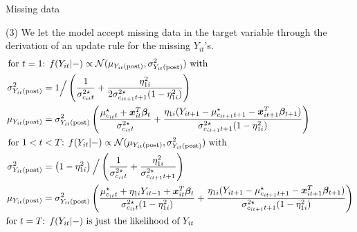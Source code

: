 \documentclass[
	11pt, %
 xcolor={dvipsnames,svgnames}
]{beamer}
\newcommand\numberthis{\addtocounter{equation}{1}\tag{\theequation}}
\begin{document}
\begin{frame}{Missing data}
    
\alert{(3) We let the model accept missing data in the target variable} through the derivation of an update rule for the missing $Y_{it}$'s.
        {\footnotesize %
\begin{align*}
\text{for }t=1 &\text{: }
  f(Y_{it}|-)\propto \text{$\mathcal{N}(\mu_{Y_{it}\text{(post)}},\sigma^2_{Y_{it}\text{(post)}})$ with}\\
\sigma^2_{Y_{it}\text{(post)}}&= 1\Big/ \left(\frac{1}{\sigma^{2\star}_{c_{it}t}} + \frac{\eta_{1i}^2}{2\sigma^{2\star}_{c_{it+1}t+1}(1-\eta_{1i}^2)}\right)\\
\mu_{Y_{it}\text{(post)}}&=  \sigma^2_{Y_{it}\text{(post)}} \left( \frac{\mu^\star_{c_{it}t} + \boldsymbol{x}_{it}^T\boldsymbol{\beta}_t}{\sigma^{2\star}_{c_{it}t}} + \frac{\eta_{1i}(Y_{it+1}-\mu^\star_{c_{it+1}t+1} - \boldsymbol{x}_{it+1}^T\boldsymbol{\beta}_{t+1})}{\sigma^{2\star}_{c_{it+1}t+1}(1-\eta_{1i}^2)} \right)\\
\text{for } 1<t&<T \text{: }
  f(Y_{it}|-)\propto \text{$\mathcal{N}(\mu_{Y_{it}\text{(post)}},\sigma^2_{Y_{it}\text{(post)}})$ with}\\
\sigma^2_{Y_{it}\text{(post)}}&= \left(1-\eta_{1i}^2\right) \Big/ \left(\frac{1}{\sigma^{2\star}_{c_{it}t}} + \frac{\eta_{1i}^2}{\sigma^{2\star}_{c_{it+1}t+1}}\right)\\
\mu_{Y_{it}\text{(post)}}&=  \sigma^2_{Y_{it}\text{(post)}} \left( \frac{\mu^\star_{c_{it}t} + \eta_{1i}Y_{it-1} 
 + \boldsymbol{x}_{it}^T\boldsymbol{\beta}_t}{\sigma^{2\star}_{c_{it}t}(1-\eta_{1i}^2)} + \frac{\eta_{1i}(Y_{it+1}-\mu^\star_{c_{it+1}t+1} - \boldsymbol{x}_{it+1}^T\boldsymbol{\beta}_{t+1})}{\sigma^{2\star}_{c_{it+1}t+1}(1-\eta_{1i}^2)} \right)\\
\text{for } t=T & \text{: }
    f(Y_{it}|-)\text{ is just the likelihood of $Y_{it}$}
\end{align*}
}
\end{frame}
\end{document}
